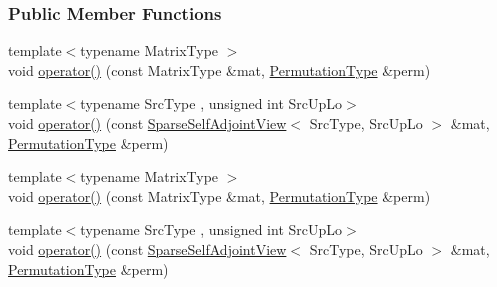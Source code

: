 \subsubsection*{Public Member Functions}
\begin{DoxyCompactItemize}
\item 
{\footnotesize template$<$typename Matrix\+Type $>$ }\\void \hyperlink{group___ordering_methods___module_afce433557abcba9e49fa81581a58fa51}{operator()} (const Matrix\+Type \&mat, \hyperlink{group___core___module}{Permutation\+Type} \&perm)
\item 
{\footnotesize template$<$typename Src\+Type , unsigned int Src\+Up\+Lo$>$ }\\void \hyperlink{group___ordering_methods___module_a7f3fd7224b084f0f5655c97ea8eb6466}{operator()} (const \hyperlink{group___sparse_core___module_class_eigen_1_1_sparse_self_adjoint_view}{Sparse\+Self\+Adjoint\+View}$<$ Src\+Type, Src\+Up\+Lo $>$ \&mat, \hyperlink{group___core___module}{Permutation\+Type} \&perm)
\item 
{\footnotesize template$<$typename Matrix\+Type $>$ }\\void \hyperlink{group___ordering_methods___module_afce433557abcba9e49fa81581a58fa51}{operator()} (const Matrix\+Type \&mat, \hyperlink{group___core___module}{Permutation\+Type} \&perm)
\item 
{\footnotesize template$<$typename Src\+Type , unsigned int Src\+Up\+Lo$>$ }\\void \hyperlink{group___ordering_methods___module_a7f3fd7224b084f0f5655c97ea8eb6466}{operator()} (const \hyperlink{group___sparse_core___module_class_eigen_1_1_sparse_self_adjoint_view}{Sparse\+Self\+Adjoint\+View}$<$ Src\+Type, Src\+Up\+Lo $>$ \&mat, \hyperlink{group___core___module}{Permutation\+Type} \&perm)
\end{DoxyCompactItemize}


